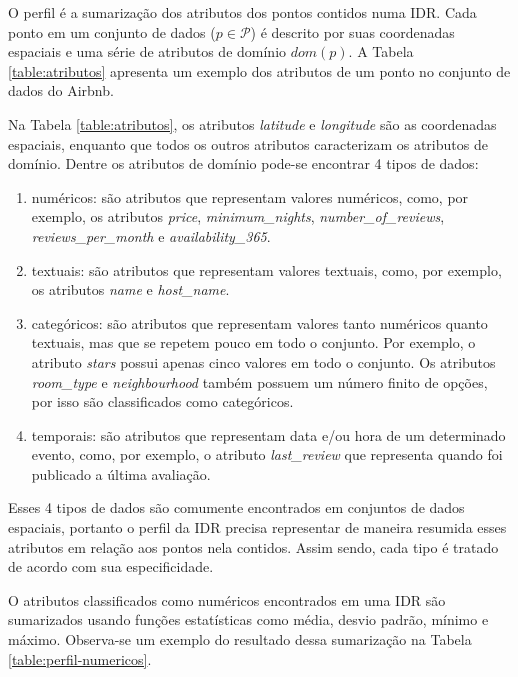 O perfil é a sumarização dos atributos dos pontos contidos numa IDR. Cada ponto em um conjunto de dados ($p \in \mathcal{P}$) é descrito por suas coordenadas espaciais e uma série de atributos de domínio $dom(p)$. A Tabela \ref{table:atributos} apresenta um exemplo dos atributos de um ponto no conjunto de dados do Airbnb.

Na Tabela \ref{table:atributos}, os atributos {\em latitude} e {\em longitude} são as coordenadas espaciais, enquanto que todos os outros atributos caracterizam os atributos de domínio. Dentre os atributos de domínio pode-se encontrar 4 tipos de dados:

\begin{enumerate}[label=\alph*)]
	\tightlist
	\item numéricos: são atributos que representam valores numéricos, como, por exemplo, os atributos {\em price}, {\em minimum\_nights}, {\em number\_of\_reviews}, {\em reviews\_per\_month} e {\em availability\_365}.
	\item textuais: são atributos que representam valores textuais, como, por exemplo, os atributos {\em name} e {\em host\_name}.
	\item categóricos: são atributos que representam valores tanto numéricos quanto textuais, mas que se repetem pouco em todo o conjunto. Por exemplo, o atributo {\em stars} possui apenas cinco valores em todo o conjunto. Os atributos {\em room\_type} e {\em neighbourhood} também possuem um número finito de opções, por isso são classificados como categóricos.
	\item temporais: são atributos que representam data e/ou hora de um determinado evento, como, por exemplo, o atributo {\em last\_review} que representa quando foi publicado a última avaliação.
\end{enumerate}

Esses 4 tipos de dados são comumente encontrados em conjuntos de dados espaciais, portanto o perfil da IDR precisa representar de maneira resumida esses atributos em relação aos pontos nela contidos. Assim sendo, cada tipo é tratado de acordo com sua especificidade.

O atributos classificados como numéricos encontrados em uma IDR são sumarizados usando funções estatísticas como média, desvio padrão, mínimo e máximo. Observa-se um exemplo do resultado dessa sumarização na Tabela \ref{table:perfil-numericos}.

